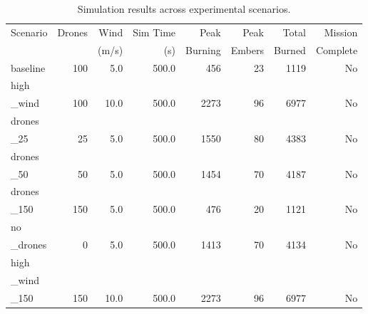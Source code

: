 \begin{table}[htbp]
\centering
\caption{Simulation results across experimental scenarios.}
\label{tab:sim-results}
\begin{tabular}{lrrrrrrr}
\toprule
Scenario & Drones & Wind & Sim Time & Peak & Peak & Total & Mission \\
         &        & (m/s) & (s) & Burning & Embers & Burned & Complete \\
\midrule
baseline & 100 & 5.0 & 500.0 & 456 & 23 & 1119 & No \\
high\\_wind & 100 & 10.0 & 500.0 & 2273 & 96 & 6977 & No \\
drones\\_25 & 25 & 5.0 & 500.0 & 1550 & 80 & 4383 & No \\
drones\\_50 & 50 & 5.0 & 500.0 & 1454 & 70 & 4187 & No \\
drones\\_150 & 150 & 5.0 & 500.0 & 476 & 20 & 1121 & No \\
no\\_drones & 0 & 5.0 & 500.0 & 1413 & 70 & 4134 & No \\
high\\_wind\\_150 & 150 & 10.0 & 500.0 & 2273 & 96 & 6977 & No \\
\bottomrule
\end{tabular}
\end{table}